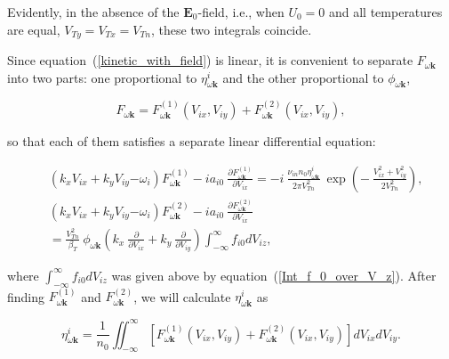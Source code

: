 \documentclass[draft]{agujournal2019}
\renewcommand{\vec}{\mathbf}
\begin{document}
Evidently, in the absence of the $\vec{E}_{0}$-field, i.e., when $U_{0}=0$ and
all temperatures are equal, $V_{Ty}=V_{Tx}=V_{Tn}$, these two
integrals coincide.

Since equation~(\ref{kinetic_with_field}) is linear, it is convenient to
separate $F_{\omega\vec{k}}$ into two parts: one proportional to $\eta
_{\omega\vec{k}}^{i}$ and the other proportional to $\phi_{\omega\vec{k}}$,
\begin{linenomath*}
\[
F_{\omega\vec{k}}=F_{\omega\vec{k}}^{(1)}(V_{ix},V_{iy})+F_{\omega\vec{k}}^{(2)}(V_{ix},V_{iy}),
\]
\end{linenomath*}
so that each of them satisfies a separate linear differential equation:
\begin{linenomath*}
\begin{subequations}
\label{Eq_forF^1,2}
\begin{align}
&  (k_{x}V_{ix}+k_{y}V_{iy}\mathbf{-}\omega_{i})F_{\omega\vec{k}}^{(1)}%
-ia_{i0}\ \frac{\partial F_{\omega\vec{k}}^{(1)}}{\partial V_{ix}}%
=-i\ \frac{\nu_{in}n_{0}\eta_{\omega\vec{k}}^{i}}{2\pi V_{Tn}^{2}}%
\ \exp\left(  -\ \frac{V_{ix}^{2}+V_{iy}^{2}}{2V_{Tn}^{2}}\right)
,
\label{Eq_forF^1}\\
&  (k_{x}V_{ix}+k_{y}V_{iy}\mathbf{-}\omega_{i})F_{\omega\vec{k}}^{(2)}%
-ia_{i0}\ \frac{\partial F_{\omega\vec{k}}^{(2)}}{\partial V_{ix}}\nonumber\\
&  =\frac{V_{Tn}^{2}}{\beta_{T}}\ \phi_{\omega\vec{k}}\left(  k_{x}%
\ \frac{\partial}{\partial V_{ix}}+k_{y}\ \frac{\partial}{\partial V_{iy}%
}\right)  \int_{-\infty}^{\infty}f_{i0}dV_{iz},
\label{Eq_forF^2}
\end{align}
\end{subequations}
\end{linenomath*}
where $\int_{-\infty}^{\infty}f_{i0}dV_{iz}$ was given above by
equation~(\ref{Int_f_0_over_V_z}). After finding $F_{\omega\vec{k}}^{(1)}$ and
$F_{\omega\vec{k}}^{(2)}$, we will calculate $\eta_{\omega\vec{k}}^{i}$ as
\begin{linenomath*}
\begin{equation}
\eta_{\omega\vec{k}}^{i}=\frac{1}{n_{0}}\iint_{-\infty}^{\infty}\left[
F_{\omega\vec{k}}^{(1)}(V_{ix},V_{iy})+F_{\omega\vec{k}}^{(2)}(V_{ix},V_{iy})\right]  dV_{ix}dV_{iy}.
\label{relation_Review}
\end{equation}
\end{linenomath*}
\end{document}
